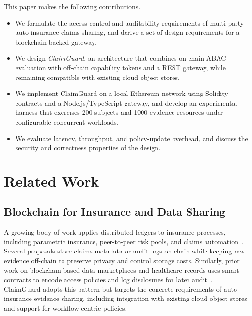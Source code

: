 \documentclass[conference]{IEEEtran}
\begin{document}
This paper makes the following contributions.
\begin{itemize}
    \item We formulate the access-control and auditability requirements of multi-party auto-insurance claims sharing, and derive a set of design requirements for a blockchain-backed gateway.
    \item We design \emph{ClaimGuard}, an architecture that combines on-chain ABAC evaluation with off-chain capability tokens and a REST gateway, while remaining compatible with existing cloud object stores.
    \item We implement ClaimGuard on a local Ethereum network using Solidity contracts and a Node.js/TypeScript gateway, and develop an experimental harness that exercises 200 subjects and 1000 evidence resources under configurable concurrent workloads.
    \item We evaluate latency, throughput, and policy-update overhead, and discuss the security and correctness properties of the design.
\end{itemize}



\section{Related Work}

\subsection{Blockchain for Insurance and Data Sharing}
A growing body of work applies distributed ledgers to insurance processes, including parametric insurance, peer-to-peer risk pools, and claims automation~\cite{goffard2024collaborative, nexusmutual2023docs, paperno2017teambrella, shetty2022blockchain, ajo}. 
Several proposals store claims metadata or audit logs on-chain while keeping raw evidence off-chain to preserve privacy and control storage costs. 
Similarly, prior work on blockchain-based data marketplaces and healthcare records uses smart contracts to encode access policies and log disclosures for later audit~\cite{ekblaw2016medrec, xiao2021healthchain}. 
ClaimGuard adopts this pattern but targets the concrete requirements of auto-insurance evidence sharing, including integration with existing cloud object stores and support for workflow-centric policies.
\end{document}
